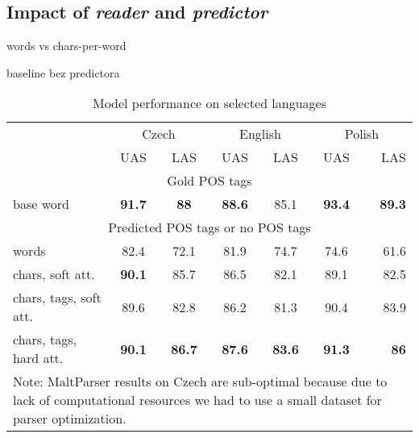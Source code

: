 \subsection{Impact of \emph{reader} and \emph{predictor}}
words vs chars-per-word

baseline bez predictora
\begin{table*}[tb]
  \centering
  \caption{Model performance on selected languages}
  \label{tab:results}
  \begin{tabular}{l|cc|cc|cr}
    & \multicolumn{2}{c|}{Czech} & \multicolumn{2}{c|}{English} & \multicolumn{2}{c|}{Polish} \\
    & UAS & LAS & UAS & LAS & UAS & LAS \\ 
    \multicolumn{7}{c}{Gold POS tags} \\  \hline
    base word & 
    \textbf{91.7} & \textbf{88} & 
    \textbf{88.6} & 85.1 & 
    \textbf{93.4} & \textbf{89.3} \\
    \multicolumn{7}{c}{Predicted POS tags or no POS tags} \\ \hline
    words & 
    82.4 & 72.1 &
    81.9 & 74.7 & 
    74.6 & 61.6  \\
    chars, soft att. & 
    \textbf{90.1} & 85.7 & %
    86.5 & 82.1 & %
    89.1 & 82.5 \\ %
    chars, tags, soft att. & 
    89.6 & 82.8 & %
    86.2 & 81.3 & %
    90.4 & 83.9 \\ %
    chars, tags, hard att. & 
    \textbf{90.1} & \textbf{86.7} & %
    \textbf{87.6} & \textbf{83.6} & %
    \textbf{91.3} & \textbf{86} \\ %

    \multicolumn{7}{p{\textwidth}}{  Note: MaltParser results on
      Czech are sub-optimal because due to lack of computational
      resources we had to use a small dataset for parser optimization.}
  \end{tabular}
\end{table*}
